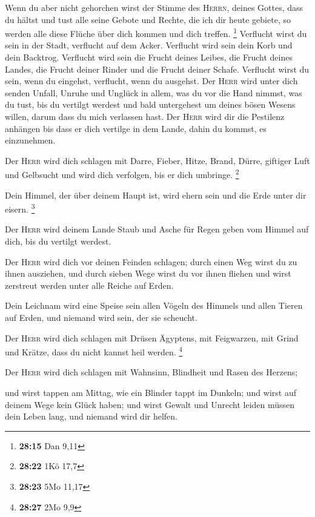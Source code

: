  Wenn du aber nicht gehorchen wirst der Stimme des
\textsc{Herrn}, deines Gottes, dass du hältst und tust alle seine Gebote
und Rechte, die ich dir heute gebiete, so werden alle diese Flüche über
dich kommen und dich treffen. \footnote{\textbf{28:15} Dan 9,11}
 Verflucht wirst du sein in der Stadt, verflucht auf dem
Acker.  Verflucht wird sein dein Korb und dein Backtrog.
 Verflucht wird sein die Frucht deines Leibes, die Frucht
deines Landes, die Frucht deiner Rinder und die Frucht deiner Schafe.
 Verflucht wirst du sein, wenn du eingehst, verflucht,
wenn du ausgehst.  Der \textsc{Herr} wird unter dich
senden Unfall, Unruhe und Unglück in allem, was du vor die Hand nimmst,
was du tust, bis du vertilgt werdest und bald untergehest um deines
bösen Wesens willen, darum dass du mich verlassen hast. 
Der \textsc{Herr} wird dir die Pestilenz anhängen bis dass er dich
vertilge in dem Lande, dahin du kommst, es einzunehmen.

 Der \textsc{Herr} wird dich schlagen mit Darre, Fieber,
Hitze, Brand, Dürre, giftiger Luft und Gelbsucht und wird dich
verfolgen, bis er dich umbringe. \footnote{\textbf{28:22} 1Kö 17,7}

 Dein Himmel, der über deinem Haupt ist, wird ehern sein
und die Erde unter dir eisern. \footnote{\textbf{28:23} 5Mo 11,17}

 Der \textsc{Herr} wird deinem Lande Staub und Asche für
Regen geben vom Himmel auf dich, bis du vertilgt werdest.

 Der \textsc{Herr} wird dich vor deinen Feinden schlagen;
durch einen Weg wirst du zu ihnen ausziehen, und durch sieben Wege wirst
du vor ihnen fliehen und wirst zerstreut werden unter alle Reiche auf
Erden.

 Dein Leichnam wird eine Speise sein allen Vögeln des
Himmels und allen Tieren auf Erden, und niemand wird sein, der sie
scheucht.

 Der \textsc{Herr} wird dich schlagen mit Drüsen
Ägyptens, mit Feigwarzen, mit Grind und Krätze, dass du nicht kannst
heil werden. \footnote{\textbf{28:27} 2Mo 9,9}

 Der \textsc{Herr} wird dich schlagen mit Wahnsinn,
Blindheit und Rasen des Herzens;

 und wirst tappen am Mittag, wie ein Blinder tappt im
Dunkeln; und wirst auf deinem Wege kein Glück haben; und wirst Gewalt
und Unrecht leiden müssen dein Leben lang, und niemand wird dir helfen.


